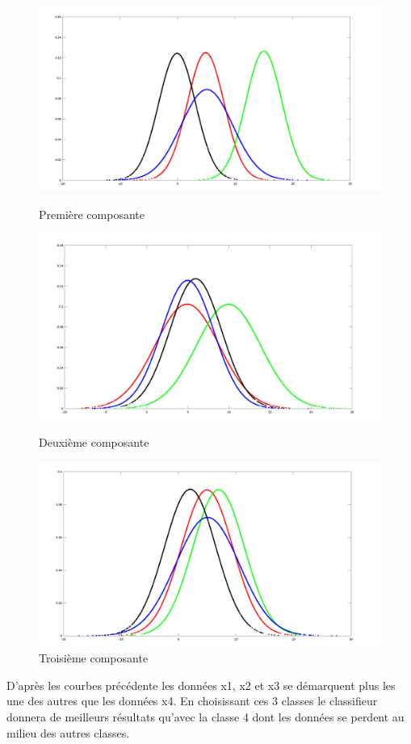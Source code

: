 \documentclass{article}
\begin{document}
\begin{figure}[h]
\centerline{\includegraphics[scale=0.24]{donnee1.png}}
\caption{Première composante}

\centerline{\includegraphics[scale=0.24]{donnee2.png}}
\caption{Deuxième composante}

\centerline{\includegraphics[scale=0.24]{donnee3.png}}
\caption{Troisième composante}
\end{figure}

D'après les courbes précédente les données x1, x2 et x3 se démarquent plus les une des autres que les données x4. En choisissant ces 3 classes le classifieur donnera de meilleurs résultats qu'avec la classe 4 dont les données se perdent au milieu des autres classes.
\end{document}
